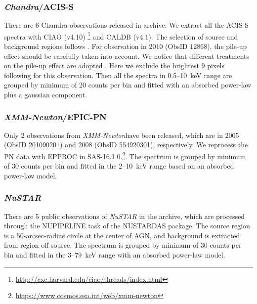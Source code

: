 \documentclass[twocolumn]{aastex63}
\newcommand{\xmm}{{\em XMM-Newton}}
\newcommand{\nustar}{{\em NuSTAR }}
\newcommand{\chandra}{{\em Chandra}}
\begin{document}
\subsubsection{\chandra/ACIS-S}
There are 6 Chandra observations released in archive. We extract all the ACIS-S spectra with CIAO (v4.10) \footnote{\url{http://cxc.harvard.edu/ciao/threads/index.html}} and {\scriptsize CALDB} (v4.1). The selection of source and background regions follows \citet{2017ApJ...840...11L}. For observation in 2010 (ObsID 12868), the pile-up effect should be carefully taken into account. We notice that different treatments on the pile-up effect are adopted \citep[see ][]{2017ApJ...840...11L,2016A&A...593L...9H,2017A&A...607L...9K}. Here we exclude the brightest 9 pixels following \citet{2016A&A...593L...9H} for this observation. Then all the spectra in 0.5--10~keV range are grouped by minimum of 20 counts per bin and fitted with an absorbed power-law plus a gaussian component. 


\subsubsection{\xmm/EPIC-PN}
Only 2 observations from \xmm have been released, which are in 2005 (ObsID 201090201) and 2008 (ObsID 554920301), respectively. We reprocess the PN data with {\scriptsize EPPROC} in SAS-16.1.0.\footnote{\url{https://www.cosmos.esa.int/web/xmm-newton}}. The spectrum is grouped by minimum of 30 counts per bin and fitted in the 2--10~keV range based on an absorbed power-law model. 



\subsubsection{\nustar}
There are 5 public observations of \nustar in the archive, which are processed through the {\scriptsize NUPIPELINE} task of the {\scriptsize NUSTARDAS} package. The source region is a 50-arcsec-radius circle at the center of AGN, and background is extracted from region off source. The spectrum is grouped by minimum of 30 counts per bin and fitted in the 3--79~keV range with an absorbed power-law model.
\end{document}

